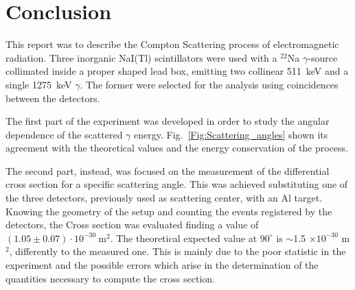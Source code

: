 
\section*{Conclusion}
This report was to describe the Compton Scattering process of electromagnetic radiation. Three inorganic NaI(Tl) scintillators were used with a $^{22}$Na $\gamma$-source collimated inside a proper shaped lead box,  emitting two collinear 511~keV  and a single 1275~keV $\gamma$. The former were selected for the analysis using coincidences between the detectors.

The first part of the experiment  was developed in order to study the angular dependence of the scattered $\gamma$ energy. Fig.~\ref{Fig:Scattering_angles} shown its agreement with the theoretical values and the energy conservation of the process.

The second part, instead, was focused on the measurement of the differential cross section for a specific scattering angle. This was achieved substituting one of the three detectors, previously used as scattering center, with an Al target. Knowing the geometry of the setup and counting the events registered by the detectors, the Cross section was evaluated finding a value of $(1.05\pm0.07)\cdot 10^{-30}\ \text{m}^{2}$.  The theoretical expected value at $90^\circ$ is $\sim$1.5 $\times 10^{-30}$ m$^2$, differently to the measured one. This is mainly due to the poor statistic in the experiment and the possible errors which arise in the determination of the quantities necessary to compute the cross section.
